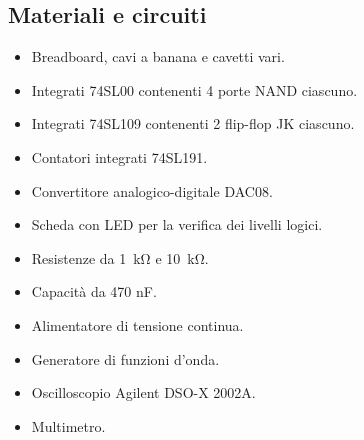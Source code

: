 \subsection{Materiali e circuiti}

\begin{itemize}
    \item{Breadboard, cavi a banana e cavetti vari.}
    \item{Integrati 74SL00 contenenti 4 porte NAND ciascuno.}
    \item{Integrati 74SL109 contenenti 2 flip-flop JK ciascuno.}
    \item{Contatori integrati 74SL191.}
    \item{Convertitore analogico-digitale DAC08.}
    \item{Scheda con LED per la verifica dei livelli logici.}
    \item{Resistenze da \SI{1}{\kilo\ohm} e \SI{10}{\kilo\ohm}.}
    \item{Capacità da 470 nF.}
    \item{Alimentatore di tensione continua.}
    \item{Generatore di funzioni d'onda.}
    \item{Oscilloscopio Agilent DSO-X 2002A.}
    \item{Multimetro.}
\end{itemize}
